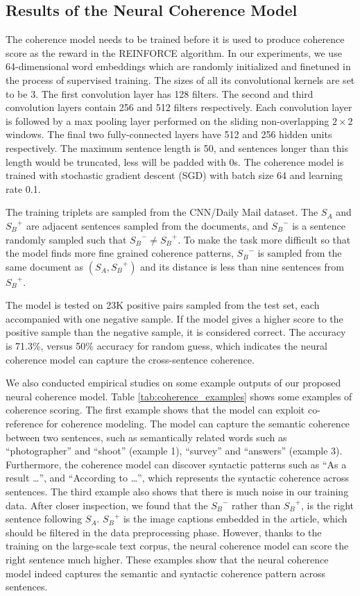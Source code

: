 \documentclass[letterpaper]{article} %
\begin{document}
	\subsection{Results of the Neural Coherence Model}
	The coherence model needs to be trained before it is used to produce coherence score as the reward in the REINFORCE algorithm. In our experiments,  we use 64-dimensional word embeddings which are randomly initialized and finetuned in the process of supervised training. The sizes of all its convolutional kernels are set to be 3. The first convolution layer has 128 filters. The second and third convolution layers contain 256 and 512 filters respectively. Each convolution layer is followed by a max pooling layer performed on the sliding non-overlapping $2\times 2$ windows.  The final two fully-connected layers have 512 and 256 hidden units respectively. The maximum sentence length is 50, and sentences longer than this length would be truncated, less will be padded with 0s. The coherence model is trained with stochastic gradient descent (SGD) with batch size 64 and learning rate 0.1. 
	
	The training triplets are sampled from the CNN/Daily Mail dataset. The $S_A$ and ${S_B}^{+}$ are adjacent sentences sampled from the documents, and ${S_B}^{-}$ is a sentence randomly sampled such that ${S_B}^{-} \neq {S_B}^{+}$. To make the task more difficult so that the model finds more fine grained coherence patterns, ${S_B}^{-}$ is sampled from the same document as $(S_A, {S_B}^{+})$ and its distance is less than nine sentences from ${S_B}^{+}$.
	
	The model is tested on 23K positive pairs sampled from the test set, each accompanied with one negative sample. If the model gives a higher score to the positive sample than the negative sample, it is considered correct. The accuracy is 71.3\%, versus 50\% accuracy for random guess, which indicates the neural coherence model can capture the cross-sentence coherence.
	
	We also conducted empirical studies on some example outputs of our proposed neural coherence model. Table \ref{tab:coherence_examples} shows some examples of coherence scoring. The first example shows that the model can exploit co-reference for coherence modeling. The model can capture the semantic coherence between two sentences, such as semantically related words such as ``photographer'' and ``shoot'' (example 1), ``survey'' and ``answers'' (example 3). Furthermore, the coherence model can discover syntactic patterns such as ``As a result \dots'', and ``According to \dots'', which represents the syntactic coherence across sentences. The third example also shows that there is much noise in our training data. After closer inspection, we found that the ${S_B}^{-}$ rather than ${S_B}^{+}$, is the right sentence following ${S_A}$. ${S_B}^{+}$ is the image captions embedded in the article, which should be filtered in the data preprocessing phase. However, thanks to the training on the large-scale text corpus, the neural coherence model can score the right sentence much higher. These examples show that the neural coherence model indeed captures the semantic and syntactic coherence pattern across sentences.
\end{document}
